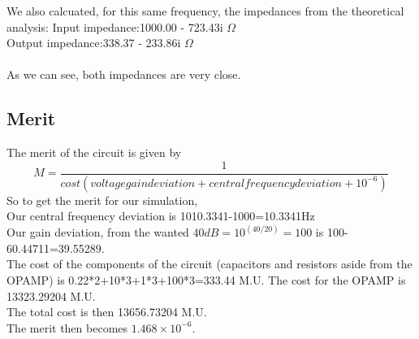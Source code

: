 We also calcuated, for this same frequency, the impedances from the theoretical analysis:
Input impedance:1000.00 -  723.43i $\Omega$\\
Output impedance:338.37 - 233.86i $\Omega$\\
\\
As we can see, both impedances are very close.\\

\subsection{Merit}
The merit of the circuit is given by
\begin{equation}
  M=\frac{1}{cost(voltage gain deviation+ central frequency deviation+10^{-6})}
\end{equation}
So to get the merit for our simulation,\\
Our central frequency deviation is 1010.3341-1000=10.3341Hz\\
Our gain deviation, from the wanted $40dB=10^{(40/20)}=100$ is 100-60.44711=39.55289.\\
The cost of the components of the circuit (capacitors and resistors aside from the OPAMP) is 0.22*2+10*3+1*3+100*3=333.44 M.U. The cost for the OPAMP is 13323.29204 M.U.\\
The total cost is then 13656.73204 M.U.\\
The merit then becomes $1.468\times 10^{-6}$.
